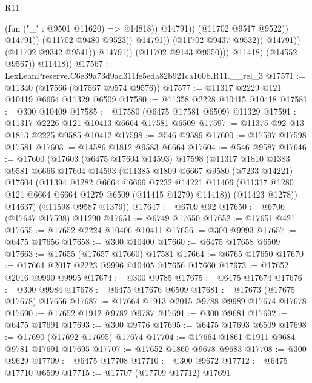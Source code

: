 \begin{lexlean}{R11}
\begin{coremodule}
                                              (fun ("_" : @9501 @11620) => @14818))
                                            @14791))
                                        (@11702 @9517 @9522))
                                      @14791))
                                  (@11702 @9480 @9523))
                                @14791))
                            (@11702 @9437 @9532))
                          @14791))
                      (@11702 @9342 @9541))
                    @14791))
                (@11702 @9143 @9550)))
            @11418)
          (@14552 @9567))
        @11418))
@17567 := LexLeanPreserve.C6e39a73d9ad311fe5eda82b921ca160b.R11.__rel_3
@17571 := @11340 (@17566 (@17567 @9574 @9576))
@17577 := @11317 @2229 @121 @10419 @6664 @11329 @6509
@17580 := @11358 @2228 @10415 @10418
@17581 := @300 @10409
@17585 := @17580 (@6475 @17581 @6509) @11329
@17591 := @11317 @2226 @121 @10413 @6664 @17581 @6509
@17597 := @11375 @92 @13 @1813 @2225 @9585 @10412
@17598 := @546 @9589
@17600 := @17597 @17598 @17581
@17603 := @14586 @1812 @9583 @6664
@17604 := @546 @9587
@17646 := @17600
    (@17603
      (@6475 @17604 @14593)
      @17598
      (@11317
        @1810
        @1383
        @9581
        @6666
        @17604
        @14593
        (@11385
          @1809
          @6667
          @9580
          (@7233 @14221)
          @17604
          (@11394
            @1282
            @6664
            @6666
            @7232
            @14221
            @11406
            (@11317 @1280 @121 @6664 @6664 @1279 @6509 (@11415 @1279) @11418))
          (@11423 @1278))
        @14637)
      (@11598 @9587 @1379))
@17647 := @6709 @92
@17650 := @6706 (@17647 @17598) @11290
@17651 := @6749 @17650
@17652 := @17651 @421
@17655 := @17652 @2224 @10406 @10411
@17656 := @300 @9993
@17657 := @6475 @17656
@17658 := @300 @10400
@17660 := @6475 @17658 @6509
@17663 := @17655 (@17657 @17660) @17581
@17664 := @6765 @17650
@17670 := @17664 @2017 @2223 @9996 @10405 @17656 @17660
@17673 := @17652 @2016 @9990 @9995
@17674 := @300 @9785
@17675 := @6475 @17674
@17676 := @300 @9984
@17678 := @6475 @17676 @6509
@17681 := @17673 (@17675 @17678) @17656
@17687 := @17664 @1913 @2015 @9788 @9989 @17674 @17678
@17690 := @17652 @1912 @9782 @9787
@17691 := @300 @9681
@17692 := @6475 @17691
@17693 := @300 @9776
@17695 := @6475 @17693 @6509
@17698 := @17690 (@17692 @17695) @17674
@17704 := @17664 @1861 @1911 @9684 @9781 @17691 @17695
@17707 := @17652 @1860 @9678 @9683
@17708 := @300 @9629
@17709 := @6475 @17708
@17710 := @300 @9672
@17712 := @6475 @17710 @6509
@17715 := @17707 (@17709 @17712) @17691

\end{coremodule}
\end{lexlean}
